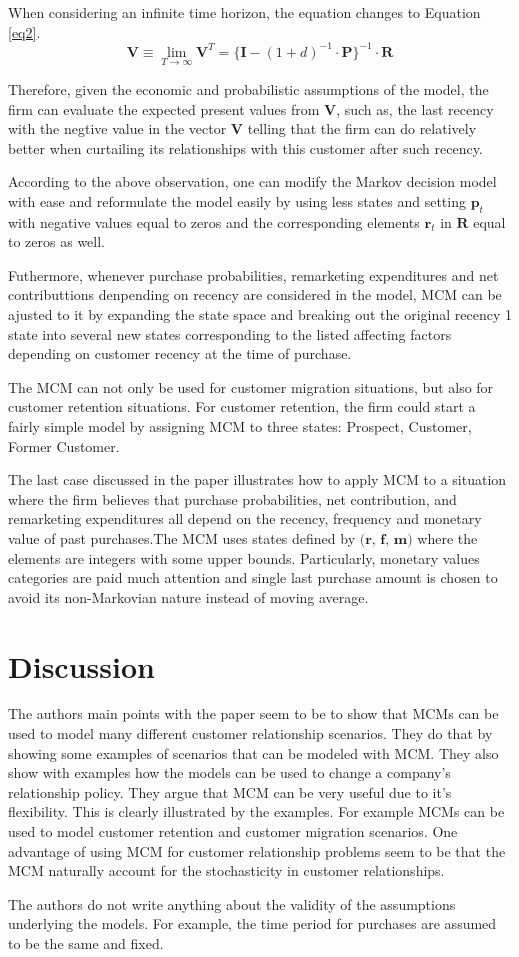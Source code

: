 \documentclass[11pt]{article}
\begin{document}
When considering an infinite time horizon, the equation changes to Equation \ref{eq2}.
\begin{equation}\label{eq2}
\textbf{V} \equiv \lim_{T \rightarrow \infty} \textbf{V}^T = \{\textbf{I} - (1 + d)^{-1} \cdot \textbf{P} \}^{-1} \cdot \textbf{R}
\end{equation}


Therefore, given the economic and probabilistic assumptions of the model, the firm can evaluate the expected present values from $\textbf{V}$, such as, the last recency with the negtive value in the vector $\textbf{V}$ telling that the firm can do relatively better when curtailing its relationships with this customer after such recency.

According to the above observation, one can modify the Markov decision model with ease and reformulate the model easily by using less states and setting $\textbf{p}_t$ with negative values equal to zeros and the corresponding elements $\textbf{r}_t$ in $\textbf{R}$ equal to zeros as well.

Futhermore, whenever purchase probabilities, remarketing expenditures and net contributtions denpending on recency are considered in the model, MCM can be ajusted to it by expanding the state space and breaking out the original recency 1 state into several new states corresponding to the listed affecting factors depending on customer recency at the time of purchase. 

The MCM can not only be used for customer migration situations, but also for customer retention situations. For customer retention, the firm could start a fairly simple model by assigning MCM to three states:  Prospect, Customer, Former Customer. 

The last case discussed in the paper illustrates how to apply MCM to a situation where the firm believes that purchase probabilities, net contribution, and remarketing expenditures all depend on the recency, frequency and monetary value of past purchases.The MCM uses states defined by $\textbf{(r, f, m)}$ where the elements are integers with some upper bounds. Particularly, monetary values categories are paid much attention and single last purchase amount is chosen to avoid its non-Markovian nature instead of moving average.




\section{Discussion}
The authors main points with the paper seem to be to show that MCMs can be used to model many different customer relationship scenarios. They do that by showing some examples of scenarios that can be modeled with MCM. They also show with examples how the models can be used to change a company's relationship policy. They argue that MCM can be very useful due to it's flexibility. This is clearly illustrated by the examples. For example MCMs can be used to model customer retention and customer migration scenarios. One advantage of using MCM for customer relationship problems seem to be that the MCM naturally account for the stochasticity in customer relationships.

The authors do not write anything about the validity of the assumptions underlying the models. 
For example, the time period for purchases are assumed to be the same and fixed.

\end{document}
